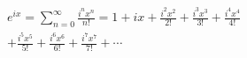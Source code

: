 \documentclass[preview]{standalone}
\begin{document}
\begin{align*}
e^{ix} = \sum_{n=0}^{\infty} \frac{i^nx^n}{n!} = 1 + ix + \frac{i^2x^2}{2!} + \frac{i^3x^3}{3!} + \frac{i^4x^4}{4!} \\ + \frac{i^5x^5}{5!}+ \frac{i^6x^6}{6!} + \frac{i^7x^7}{7!} + \cdots
\end{align*}
\end{document}

